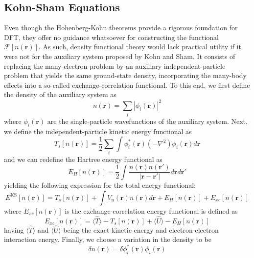 \subsection{Kohn-Sham Equations}
Even though the Hohenberg-Kohn theorems provide a rigorous foundation for DFT, they offer no guidance whatsoever for constructing the functional $\mathcal{F}[n(\mathbf{r})]$. As such, density functional theory would lack practical utility if it were not for the auxiliary system proposed by Kohn and Sham\supercite{martin2020electronic}. It consists of replacing the many-electron problem by an auxiliary independent-particle problem that yields the same ground-state density, incorporating the many-body effects into a so-called exchange-correlation functional. To this end, we first define the density of the auxiliary system as
\begin{equation}
  n(\mathbf{r}) = \sum_i |\phi_i(\mathbf{r})|^2
  \label{eq49}
\end{equation}
where $\phi_i(\mathbf{r})$ are the single-particle wavefunctions of the auxiliary system. Next, we define the independent-particle kinetic energy functional as 
\begin{equation}
  \label{eq50}
  T_s[n(\mathbf{r})] = \frac{1}{2}\sum_i \int \phi_i^*(\mathbf{r}) (-\nabla^2 )\phi_i(\mathbf{r}) d\mathbf{r}
\end{equation}
and we can redefine the Hartree energy functional  as 
\begin{equation}
  \label{eq51}
  E_H[n(\mathbf{r})] = \frac{1}{2} \int \frac{n(\mathbf{r}) n(\mathbf{r'})}{|\mathbf{r} - \mathbf{r'}|} d\mathbf{r} d\mathbf{r'}
\end{equation}
yielding the following expression for the total energy functional:
\begin{equation}
  \label{eq52}
  E^{\text{KS}}[n(\mathbf{r})] = T_s[n(\mathbf{r})] + \int V_{\text{n}}(\mathbf{r}) n(\mathbf{r}) d\mathbf{r} + E_H[n(\mathbf{r})] + E_{xc}[n(\mathbf{r})]
\end{equation}
where $E_{xc}[n(\mathbf{r})]$ is the exchange-correlation energy functional is defined as
\begin{equation}
  \label{eq53}
  E_{xc}[n(\mathbf{r})] = \langle \hat{T} \rangle - T_s[n(\mathbf{r})] + \langle \hat{U}\rangle - E_H[n(\mathbf{r})]
\end{equation}
having $\langle \hat{T} \rangle$ and $\langle \hat{U} \rangle$ being the exact kinetic energy and electron-electron interaction energy. Finally, we choose a variation in the density to be 
\begin{equation}
  \delta n(\mathbf{r}) = \delta \phi_i^*(\mathbf{r}) \phi_i(\mathbf{r}) 
  \label{eq54}
\end{equation}
